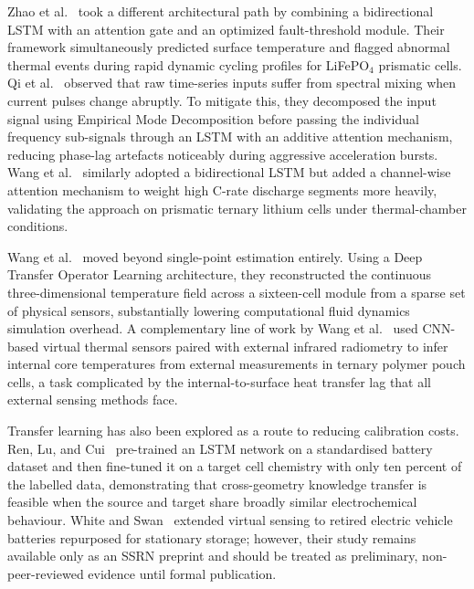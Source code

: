 \documentclass[conference]{IEEEtran}
\begin{document}
Zhao et al.~\cite{zhao2024online} took a different architectural path by combining a bidirectional LSTM with an attention gate and an optimized fault-threshold module. Their framework simultaneously predicted surface temperature and flagged abnormal thermal events during rapid dynamic cycling profiles for LiFePO$_4$ prismatic cells. Qi et al.~\cite{qi2024frequency} observed that raw time-series inputs suffer from spectral mixing when current pulses change abruptly. To mitigate this, they decomposed the input signal using Empirical Mode Decomposition before passing the individual frequency sub-signals through an LSTM with an additive attention mechanism, reducing phase-lag artefacts noticeably during aggressive acceleration bursts. Wang et al.~\cite{wang2025lithium} similarly adopted a bidirectional LSTM but added a channel-wise attention mechanism to weight high C-rate discharge segments more heavily, validating the approach on prismatic ternary lithium cells under thermal-chamber conditions.

Wang et al.~\cite{wang2024deep} moved beyond single-point estimation entirely. Using a Deep Transfer Operator Learning architecture, they reconstructed the continuous three-dimensional temperature field across a sixteen-cell module from a sparse set of physical sensors, substantially lowering computational fluid dynamics simulation overhead. A complementary line of work by Wang et al.~\cite{wang2021internal} used CNN-based virtual thermal sensors paired with external infrared radiometry to infer internal core temperatures from external measurements in ternary polymer pouch cells, a task complicated by the internal-to-surface heat transfer lag that all external sensing methods face.

Transfer learning has also been explored as a route to reducing calibration costs. Ren, Lu, and Cui~\cite{ren2023deep} pre-trained an LSTM network on a standardised battery dataset and then fine-tuned it on a target cell chemistry with only ten percent of the labelled data, demonstrating that cross-geometry knowledge transfer is feasible when the source and target share broadly similar electrochemical behaviour. White and Swan~\cite{white2024virtual} extended virtual sensing to retired electric vehicle batteries repurposed for stationary storage; however, their study remains available only as an SSRN preprint and should be treated as preliminary, non-peer-reviewed evidence until formal publication.
\end{document}
